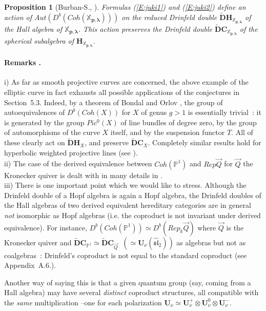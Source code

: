 \documentclass[a4paper,10pt]{amsart}
\def\H{\mathbf{H}}
\def\U{\mathbf{U}}
\def\CC{\mathbf{C}}
\def\xpl{\mathbb{X}_{\mathbf{p},\boldsymbol{\lambda}}}
\newtheorem{prop}[theo]{Proposition}
\numberwithin{equation}{section}
\begin{document}
{\vspace{.1in}

\begin{prop}[Burban-S., \cite{BS2}] Formulas (\ref{E:juki1}) and (\ref{E:juki2}) define an action of
$Aut(D^b(Coh(\xpl)))$ on the reduced Drinfeld double $\widetilde{\mathbf{D}}\H_{\xpl}$ of the Hall algebra of $\xpl$. This action preserves the Drinfeld double $\widetilde{\mathbf{D}}\CC_{\xpl}$ of the spherical subalgebra of $\H_{\xpl}$.
\end{prop}

\vspace{.15in}

\addtocounter{theo}{1}
\paragraph{\textbf{Remarks \thetheo.}} i) As far as smooth projective curves are concerned, the above example of the elliptic curve in fact exhausts all possible applications of the conjectures in Section~5.3. Indeed, by a theorem of Bondal and Orlov \cite{BO}, the group of autoequivalences of $D^b(Coh(X))$ for $X$ of genus $g >1$ is essentially trivial~: it is generated by the group $Pic^0(X)$ of line bundles of degree zero, by the group of automorphisms of the curve $X$ itself, and by the suspension functor $T$. All of these clearly act on $\widetilde{\mathbf{D}}\H_{X}$, and preserve $\widetilde{\mathbf{D}}\CC_X$. Completely similar results hold for hyperbolic weighted projective lines (see \cite{LM2}).\\
ii) The case of the derived equivalence between $Coh(\mathbb{P}^1)$ and $Rep\vec{Q}$ for $\vec{Q}$ the Kronecker quiver is dealt with in many details in \cite{BS3}.\\
iii) There is one important point which we would like to stress. Although the Drinfeld double of a Hopf algebra is again a Hopf algebra, the Drinfeld doubles of the Hall algebras of two derived equivalent hereditary categories are in general \textit{not} isomorphic as Hopf algebras (i.e. the coproduct is not invariant under derived equivalence). For instance, $D^b(Coh(\mathbb{P}^1)) \simeq D^b(Rep_k\vec{Q})$ where $\vec{Q}$ is the Kronecker quiver and $\widetilde{\mathbf{D}}\CC_{\mathbb{P}^1} \simeq \widetilde{\mathbf{D}}\CC_{\vec{Q}}\;\; (\simeq \U_\nu(\widehat{\mathfrak{sl}}_2))$ as algebras but not as coalgebras~: Drinfeld's coproduct is not equal to the standard coproduct (see Appendix~A.6.).

Another way of saying this is that a given quantum group (say, coming from a Hall algebra) may have several \textit{distinct} coproduct structures, all compatible with the \textit{same} multiplication --one for each polarization
$\U_{\nu} \simeq \U_{\nu}^+ \otimes \U_{\nu}^0 \otimes \U_{\nu}^-$.

}
\end{document}
